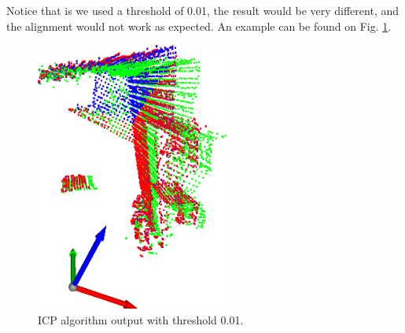 \documentclass[journal]{IEEEtran}
\begin{document}
Notice that is we used a threshold of 0.01, the result would be very different, and the alignment would not work as expected. An example can be found on Fig. \ref{fig:7.5_icp_0.01}.

\begin{figure}[htp]
  \centering
  \includegraphics[width=2.5in]{imgs/7.5_icp_0.01.png}
  \caption{ICP algorithm output with threshold 0.01.}
  \label{fig:7.5_icp_0.01}
\end{figure}
\FloatBarrier








%
%
\end{document}
